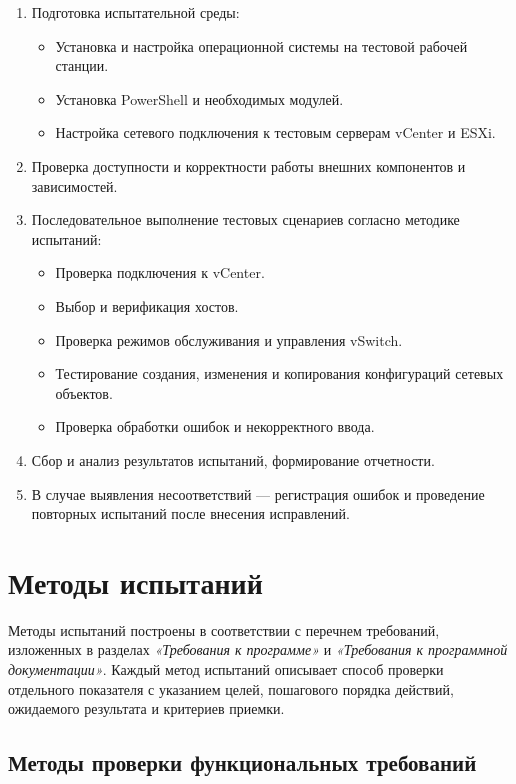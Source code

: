 \begin{enumerate}
    \item Подготовка испытательной среды:
    \begin{itemize}
        \item Установка и настройка операционной системы на тестовой рабочей станции.
        \item Установка PowerShell и необходимых модулей.
        \item Настройка сетевого подключения к тестовым серверам vCenter и ESXi.
    \end{itemize}
    \item Проверка доступности и корректности работы внешних компонентов и зависимостей.
    \item Последовательное выполнение тестовых сценариев согласно методике испытаний:
    \begin{itemize}
        \item Проверка подключения к vCenter.
        \item Выбор и верификация хостов.
        \item Проверка режимов обслуживания и управления vSwitch.
        \item Тестирование создания, изменения и копирования конфигураций сетевых объектов.
        \item Проверка обработки ошибок и некорректного ввода.
    \end{itemize}
    \item Сбор и анализ результатов испытаний, формирование отчетности.
    \item В случае выявления несоответствий — регистрация ошибок и проведение повторных испытаний после внесения исправлений.
\end{enumerate}

\newpage
\section{Методы испытаний}

Методы испытаний построены в соответствии с перечнем требований, изложенных в разделах \textit{«Требования к программе»} и \textit{«Требования к программной документации»}. Каждый метод испытаний описывает способ проверки отдельного показателя с указанием целей, пошагового порядка действий, ожидаемого результата и критериев приемки.

\subsection{Методы проверки функциональных требований}

